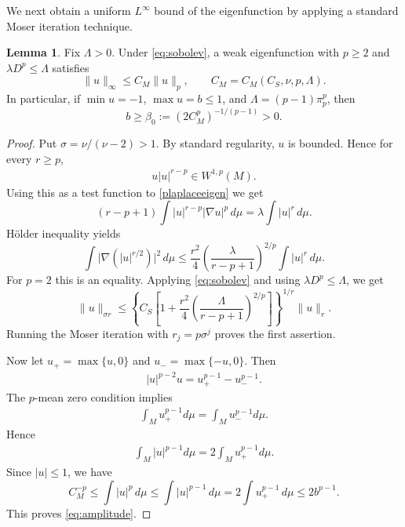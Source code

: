\documentclass[11pt]{amsart}
\theoremstyle{definition}
\newtheorem{lemma}[theorem]{Lemma}
\begin{document}
We next obtain a uniform $L^\infty$ bound of the eigenfunction by applying a standard Moser iteration technique.
\begin{lemma}\label{lem:amplitude}
Fix $\Lambda>0$. Under \eqref{eq:sobolev}, a weak eigenfunction
with $p\ge2$ and $\lambda D^p\le\Lambda$ satisfies
\[
 \|u\|_\infty\le C_M\|u\|_p,
 \qquad C_M=C_M(C_S,\nu,p,\Lambda).
\]
In particular, if $\min u=-1$, $\max u=b\le1$, and
$\Lambda=(p-1)\pi^p_p$, then
\begin{equation}\label{eq:amplitude}
 b\ge\beta_0:=(2C_M^p)^{-1/(p-1)}>0.
\end{equation}
\end{lemma}
\begin{proof}
Put $\sigma=\nu/(\nu-2)>1$. By standard regularity, $u$ is bounded. Hence for every $r\geq p$, 
\begin{align*}
    u|u|^{r-p}\in W^{1,p}(M).
\end{align*}
Using this as a test function to \eqref{plaplaceeigen} we get
\[
 (r-p+1)\int |u|^{r-p}|\nabla u|^p\,d\mu
             =\lambda\int |u|^r\,d\mu.
\]
H\"older inequality yields
\[
 \int\bigl|\nabla(|u|^{r/2})\bigr|^2\,d\mu
 \le\frac{r^2}{4}
       \left(\frac{\lambda}{r-p+1}\right)^{2/p}
       \int |u|^r\,d\mu.
\]
For $p=2$ this is an equality. Applying
\eqref{eq:sobolev} and using $\lambda D^p\leq \Lambda$, we get
\begin{equation}\label{eq:moser}
 \|u\|_{\sigma r}\le
 \left\{C_S\left[1+\frac{r^2}{4}
  \left(\frac{\Lambda}{r-p+1}\right)^{2/p}\right]\right\}^{1/r}
 \|u\|_r.
\end{equation}
Running the Moser iteration with $r_j=p\sigma^j$ proves the first assertion.

Now let $u_+=\max\{u,0\}$ and $u_-=\max\{-u,0\}$.  Then
\begin{align*}
    |u|^{p-2}u=u_+^{p-1}-u_-^{p-1}.
\end{align*}
The $p$-mean zero condition implies
\begin{align*}
    \int_Mu_+^{p-1}d\mu=\int_Mu_-^{p-1}d\mu.
\end{align*}
Hence
\begin{align*}
\int_M |u|^{p-1}d\mu=2\int_Mu_+^{p-1}d\mu.
\end{align*}
Since $|u|\leq 1$, we have
\[
 C_M^{-p}\le\int|u|^p\,d\mu
 \le\int|u|^{p-1}\,d\mu
 =2\int u_+^{p-1}\,d\mu\le2b^{p-1}.
\]
This proves \eqref{eq:amplitude}.
\end{proof}
\end{document}

